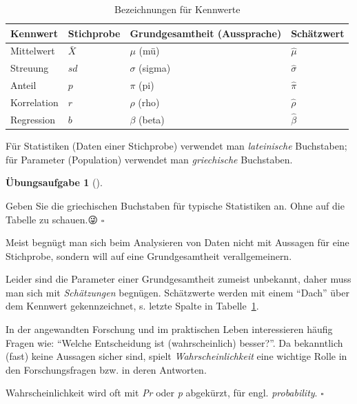 \documentclass[
  ngerman,
  letterpaper,
  twoside,
  open=any]{scrbook}
\theoremstyle{definition}
\theoremstyle{plain}
\theoremstyle{definition}
\newtheorem{exercise}{Übungsaufgabe}[chapter]
\theoremstyle{definition}
\theoremstyle{definition}
\theoremstyle{definition}
\newtheorem{exercise}{Übungsaufgabe}[chapter]
\theoremstyle{remark}
\begin{document}
{

\begin{longtable}[]{@{}llll@{}}

\caption{\label{tbl-kennwerte}Bezeichnungen für Kennwerte}

\tabularnewline

\toprule\noalign{}
Kennwert & Stichprobe & Grundgesamtheit (Aussprache) & Schätzwert \\
\midrule\noalign{}
\endhead
\bottomrule\noalign{}
\endlastfoot
Mittelwert & \(\bar{X}\) & \(\mu\) (mü) & \(\hat{\mu}\) \\
Streuung & \(sd\) & \(\sigma\) (sigma) & \(\hat{\sigma}\) \\
Anteil & \(p\) & \(\pi\) (pi) & \(\hat{\pi}\) \\
Korrelation & \(r\) & \(\rho\) (rho) & \(\hat{\rho}\) \\
Regression & \(b\) & \(\beta\) (beta) & \(\hat{\beta}\) \\

\end{longtable}

}

Für Statistiken (Daten einer Stichprobe) verwendet man
\emph{lateinische} Buchstaben; für Parameter (Population) verwendet man
\emph{griechische} Buchstaben.

\begin{exercise}[]\protect\hypertarget{exr-greek}{}\label{exr-greek}

Geben Sie die griechischen Buchstaben für typische Statistiken an. Ohne
auf die Tabelle zu schauen.😜 \(\square\)

\end{exercise}

Meist begnügt man sich beim Analysieren von Daten nicht mit Aussagen für
eine Stichprobe, sondern will auf eine Grundgesamtheit verallgemeinern.

Leider sind die Parameter einer Grundgesamtheit zumeist unbekannt, daher
muss man sich mit \emph{Schätzungen} begnügen. Schätzwerte werden mit
einem \enquote{Dach} über dem Kennwert gekennzeichnet, s. letzte Spalte
in Tabelle~\ref{tbl-kennwerte}.

In der angewandten Forschung und im praktischen Leben interessieren
häufig Fragen wie: \enquote{Welche Entscheidung ist (wahrscheinlich)
besser?}. Da bekanntlich (fast) keine Aussagen sicher sind, spielt
\emph{Wahrscheinlichkeit} eine wichtige Rolle in den Forschungsfragen
bzw. in deren Antworten.

\begin{tcolorbox}[enhanced jigsaw, arc=.35mm, bottomrule=.15mm, bottomtitle=1mm, breakable, colback=white, colbacktitle=quarto-callout-note-color!10!white, colframe=quarto-callout-note-color-frame, coltitle=black, left=2mm, leftrule=.75mm, opacityback=0, opacitybacktitle=0.6, rightrule=.15mm, title=\textcolor{quarto-callout-note-color}{\faInfo}\hspace{0.5em}{Hinweis}, titlerule=0mm, toprule=.15mm, toptitle=1mm]

Wahrscheinlichkeit wird oft mit \emph{Pr} oder \emph{p} abgekürzt, für
engl. \emph{probability}. \(\square\)

\end{tcolorbox}
\end{document}
